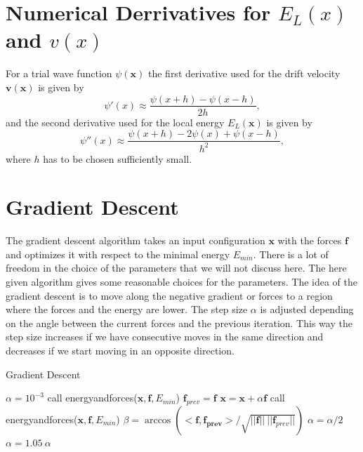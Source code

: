 \documentclass [12pt]{report}
\begin{document}
\begin{appendices}
\chapter{Numerical Derrivatives for $E_L(x)$ and $v(x)$} \label{appendixC}
For a trial wave function $\psi(\bm{x})$ the first derivative used for the drift velocity $\bm{v}(\bm{x})$ is given by
\begin{equation}
\psi'(x) \approx \frac{\psi(x + h) - \psi(x - h)}{2h},
\end{equation}
and the second derivative used for the local energy $E_L(\bm{x})$ is given by
\begin{equation}
\psi''(x) \approx \frac{\psi(x + h) - 2 \psi(x) + \psi(x - h)}{h^2},
\end{equation}
where $h$ has to be chosen sufficiently small.

\chapter{Gradient Descent} \label{gradient_descent}
The gradient descent algorithm takes an input configuration $\bm{x}$ with the forces $\bm{f}$ and optimizes it with respect to the minimal energy $E_{min}$. There is a lot of freedom in the choice of the parameters that we will not discuss here. The here given algorithm gives some reasonable choices for the parameters. The idea of the gradient descent is to move along the negative gradient or forces to a region where the forces and the energy are lower. The step size $\alpha$ is adjusted depending on the angle between the current forces and the previous iteration. This way the step size increases if we have consecutive moves in the same direction and decreases if we start moving in an opposite direction. 
\begin{algorithm}
\caption{Gradient Descent}\label{grad_desc}
\begin{algorithmic}[1]
 
\State $\alpha = 10^{-3}$
\State call energyandforces($\bm{x}, \bm{f}, E_{min}$)
 
	\State $\bm{f}_{prev} = \bm{f}$	
	\State $\bm{x} = \bm{x} + \alpha \bm{f}$
	\State call energyandforces($\bm{x}, \bm{f}, E_{min}$)
	\State $\beta = \arccos{(<\bm{f},\bm{f_{prev}}>/\sqrt{||\bm{f}||\:||\bm{f}_{prev}||})}$ 
	 
		\State $\alpha = \alpha/2$
	\Else
		\State $\alpha = 1.05\ \alpha$
	\EndIf
\EndWhile
\EndProcedure
\end{algorithmic}
\end{algorithm}
\end{appendices}



\end{document}
